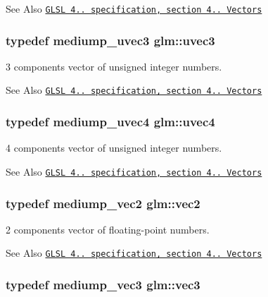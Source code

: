 \begin{DoxySeeAlso}{See Also}
\href{http://www.opengl.org/registry/doc/GLSLangSpec.4.20.8.pdf}{\tt G\-L\-S\-L 4.. specification, section 4.. Vectors} 
\end{DoxySeeAlso}
\hypertarget{group__core__types_ga713379218af0a01d0a7b1e631066106c}{
\subsubsection[{uvec3}]{\setlength{\rightskip}{0pt plus 5cm}typedef mediump\-\_\-uvec3 {\bf glm\-::uvec3}}}\label{group__core__types_ga713379218af0a01d0a7b1e631066106c}


3 components vector of unsigned integer numbers. 

\begin{DoxySeeAlso}{See Also}
\href{http://www.opengl.org/registry/doc/GLSLangSpec.4.20.8.pdf}{\tt G\-L\-S\-L 4.. specification, section 4.. Vectors} 
\end{DoxySeeAlso}
\hypertarget{group__core__types_gae85130f09c272fcd64da1353c09dddef}{
\subsubsection[{uvec4}]{\setlength{\rightskip}{0pt plus 5cm}typedef mediump\-\_\-uvec4 {\bf glm\-::uvec4}}}\label{group__core__types_gae85130f09c272fcd64da1353c09dddef}


4 components vector of unsigned integer numbers. 

\begin{DoxySeeAlso}{See Also}
\href{http://www.opengl.org/registry/doc/GLSLangSpec.4.20.8.pdf}{\tt G\-L\-S\-L 4.. specification, section 4.. Vectors} 
\end{DoxySeeAlso}
\hypertarget{group__core__types_ga66d091b759687504ab01365fbd33a1dd}{
\subsubsection[{vec2}]{\setlength{\rightskip}{0pt plus 5cm}typedef mediump\-\_\-vec2 {\bf glm\-::vec2}}}\label{group__core__types_ga66d091b759687504ab01365fbd33a1dd}


2 components vector of floating-\/point numbers. 

\begin{DoxySeeAlso}{See Also}
\href{http://www.opengl.org/registry/doc/GLSLangSpec.4.20.8.pdf}{\tt G\-L\-S\-L 4.. specification, section 4.. Vectors} 
\end{DoxySeeAlso}
\hypertarget{group__core__types_gad45787527c6ff2bd6680867204eb0354}{
\subsubsection[{vec3}]{\setlength{\rightskip}{0pt plus 5cm}typedef mediump\-\_\-vec3 {\bf glm\-::vec3}}}\label{group__core__types_gad45787527c6ff2bd6680867204eb0354}


